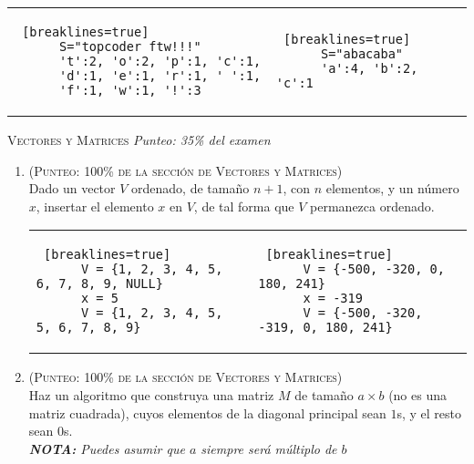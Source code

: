 \documentclass{article}
\begin{document}
\begin{enumerate}
\begin{tabular} {p{8.5cm} p{8.5cm}}
    \begin{lstlisting} [breaklines=true]
      S="topcoder ftw!!!"
      't':2, 'o':2, 'p':1, 'c':1, 
      'd':1, 'e':1, 'r':1, ' ':1, 
      'f':1, 'w':1, '!':3
    \end{lstlisting} &
    
    \begin{lstlisting} [breaklines=true]
      S="abacaba"
      'a':4, 'b':2, 'c':1
    \end{lstlisting}
    
  \end{tabular}
  
\end{enumerate}

\hrulefill

\textsc{Vectores y Matrices} \textit{Punteo: 35\% del examen}
\begin{enumerate}
\item \textsc{(Punteo: 100\% de la sección de Vectores y Matrices)} \\
  Dado un vector $V$ ordenado, de tamaño $n+1$, con $n$ elementos, y un número $x$, insertar el elemento $x$ en $V$, de tal forma que $V$ permanezca ordenado.   
  
  \begin{tabular} {p{8.5cm} p{8.5cm}}
    
    \begin{lstlisting} [breaklines=true]
      V = {1, 2, 3, 4, 5, 6, 7, 8, 9, NULL}
      x = 5
      V = {1, 2, 3, 4, 5, 5, 6, 7, 8, 9}
    \end{lstlisting} &
    
    \begin{lstlisting} [breaklines=true]
      V = {-500, -320, 0, 180, 241}
      x = -319
      V = {-500, -320, -319, 0, 180, 241}
    \end{lstlisting}
    
  \end{tabular}
  
\newpage
\item \textsc{(Punteo: 100\% de la sección de Vectores y Matrices)} \\
  Haz un algoritmo que construya una matriz $M$ de tamaño $a \times b$ (no es una matriz cuadrada), cuyos elementos de la diagonal principal sean $1$s, y el resto sean $0$s. \\
  \textit{\textbf{NOTA:} Puedes asumir que $a$ siempre será múltiplo de $b$}

  \begin{tabular} {p{8.5cm} p{8.5cm}}
    

\end{tabular}
\end{enumerate}
\end{document}
